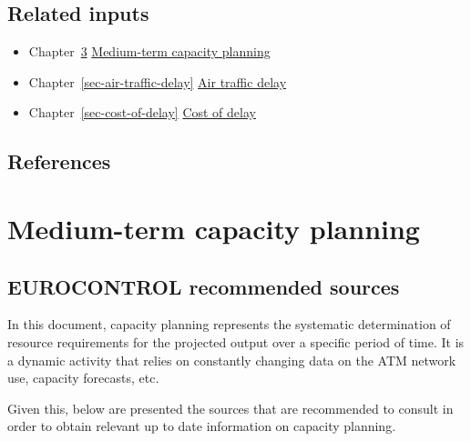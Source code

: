 \documentclass[
  11pt,
  a4paper,
]{book}
\providecommand{\tightlist}{%
  \setlength{\itemsep}{0pt}\setlength{\parskip}{0pt}}\usepackage{longtable,booktabs,array}
\begin{document}
\hypertarget{related-inputs}{%
\section{Related inputs}\label{related-inputs}}

\begin{itemize}
\tightlist
\item
  Chapter~\ref{sec-medium-term-capacity-planning}
  \protect\hyperlink{sec-medium-term-capacity-planning}{Medium-term
  capacity planning}
\item
  Chapter~\ref{sec-air-traffic-delay}
  \protect\hyperlink{sec-air-traffic-delay}{Air traffic delay}
\item
  Chapter~\ref{sec-cost-of-delay}
  \protect\hyperlink{sec-cost-of-delay}{Cost of delay}
\end{itemize}

\hypertarget{references-1}{%
\section{References}\label{references-1}}

\hypertarget{sec-medium-term-capacity-planning}{%
\chapter{Medium-term capacity
planning}\label{sec-medium-term-capacity-planning}}

\hypertarget{eurocontrol-recommended-sources}{%
\section{EUROCONTROL recommended
sources}\label{eurocontrol-recommended-sources}}

In this document, capacity planning represents the systematic
determination of resource requirements for the projected output over a
specific period of time. It is a dynamic activity that relies on
constantly changing data on the ATM network use, capacity forecasts,
etc.

Given this, below are presented the sources that are recommended to
consult in order to obtain relevant up to date information on capacity
planning.
\end{document}
